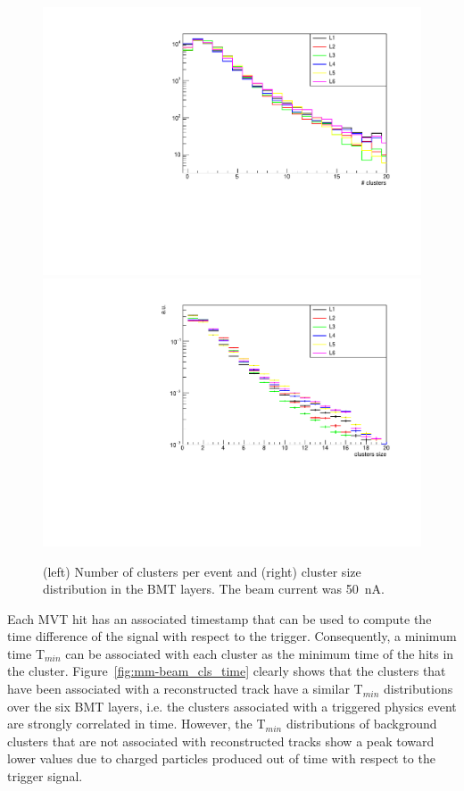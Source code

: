 \begin{figure}[htb]
 \includegraphics[width=.49\columnwidth,keepaspectratio]{images/beam_num_cls.pdf}
 \includegraphics[width=.49\columnwidth,keepaspectratio]{images/beam_cls_size.pdf}
 \caption{(left) Number of clusters per event and (right) cluster size distribution in the BMT layers. The beam current was 50~nA.}
 \label{fig:mm-beam_cls}
\end{figure}

Each MVT hit has an associated timestamp that can be used to compute the time difference of the signal with respect to the
trigger. Consequently, a minimum time T$_{min}$ can be associated with each cluster as the minimum time of the hits in the cluster.
Figure~\ref{fig:mm-beam_cls_time} clearly shows that the clusters that have been associated with a reconstructed track have
a similar T$_{min}$ distributions over the six BMT layers, i.e. the clusters associated with a triggered physics event are strongly
correlated in time. However, the T$_{min}$ distributions of background clusters that are not associated with reconstructed tracks
show a peak toward lower values due to charged particles produced out of time with respect to the trigger signal.

